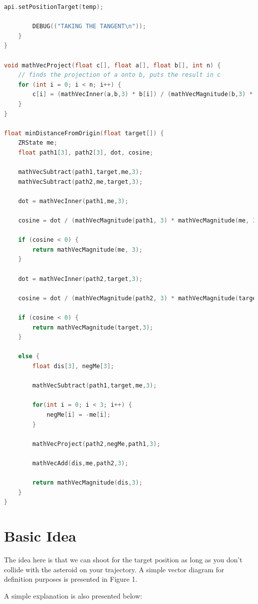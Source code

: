 \documentclass [12 pt, twoside] {article}
\begin{document}
\begin{lstlisting}[language=C++]
		api.setPositionTarget(temp);
		
		DEBUG(("TAKING THE TANGENT\n"));
	}
}

void mathVecProject(float c[], float a[], float b[], int n) {
    // finds the projection of a onto b, puts the result in c
    for (int i = 0; i < n; i++) {
        c[i] = (mathVecInner(a,b,3) * b[i]) / (mathVecMagnitude(b,3) * mathVecMagnitude(b,3));
    }
}

float minDistanceFromOrigin(float target[]) {
	ZRState me;
	float path1[3], path2[3], dot, cosine;
	
	mathVecSubtract(path1,target,me,3);
	mathVecSubtract(path2,me,target,3);
	
	dot = mathVecInner(path1,me,3);
	
	cosine = dot / (mathVecMagnitude(path1, 3) * mathVecMagnitude(me, 3));
	
	if (cosine < 0) {
		return mathVecMagnitude(me, 3);
	}
	
	dot = mathVecInner(path2,target,3);
	
	cosine = dot / (mathVecMagnitude(path2, 3) * mathVecMagnitude(target, 3));
	
	if (cosine < 0) {
		return mathVecMagnitude(target,3);
	}
	
	else {
		float dis[3], negMe[3];
		
		mathVecSubtract(path1,target,me,3);
		
		for(int i = 0; i < 3; i++) {
			negMe[i] = -me[i];
		}
		
		mathVecProject(path2,negMe,path1,3);
		
		mathVecAdd(dis,me,path2,3);
		
		return mathVecMagnitude(dis,3);
	}
}
\end{lstlisting}

\section{Basic Idea}


\indent The idea here is that we can shoot for the target position as long as you don’t collide with the
asteroid on your trajectory. A simple vector diagram for definition purposes is presented in Figure 1.


A simple explanation is also presented below:
\end{document}

